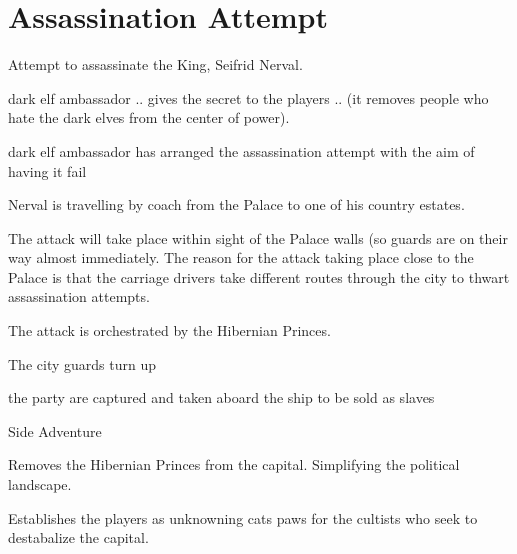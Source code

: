 \documentclass[a4paper]{style/dnd5}
\begin{document}
\section*{Assassination Attempt}


\begin{precis}
\item Attempt to assassinate the King, Seifrid Nerval.
\item dark elf ambassador .. gives the secret to the players .. (it removes people who hate the dark elves from the center of power).
\item dark elf ambassador has arranged the assassination attempt with the aim of having it fail
\item Nerval is travelling by coach from the Palace to one of his country estates.
\item The attack will take place within sight of the Palace walls (so guards are on their way almost immediately.  The reason for the attack taking place close to the Palace is that the carriage drivers take different routes through the city to thwart assassination attempts.  
\item The attack is orchestrated by the Hibernian Princes.
\end{precis}


\begin{outs} 
\item The city guards turn up
\item the party are captured and taken aboard the ship to be sold as slaves
\end{outs}

\begin{purpose}
\item Side Adventure
\item Removes the Hibernian Princes from the capital.  Simplifying the political landscape.
\item Establishes the players as unknowning cats paws for the cultists who seek to destabalize the capital.
\end{purpose}
     
\end{document}
